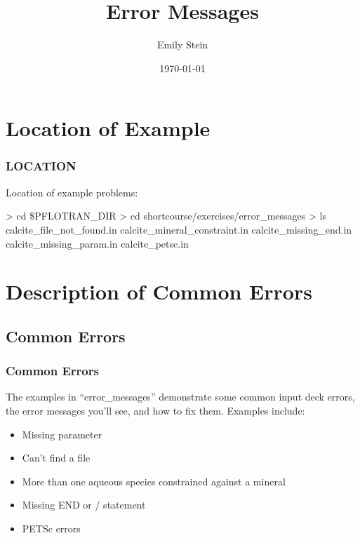 \documentclass[aspectratio=169]{beamer}
\newcommand\greencomment[1]{{{\color{green} #1}}}
\begin{document}
\title{Error Messages}
\author{Emily Stein}
\date{\today}

\frame{\titlepage}

\section{Location of Example}

\begin{frame}\frametitle{LOCATION}

Location of example problems:

\begin{semiverbatim}
> cd \$PFLOTRAN_DIR
> cd shortcourse/exercises/error_messages
> ls
calcite_file_not_found.in
calcite_mineral_constraint.in
calcite_missing_end.in
calcite_missing_param.in
calcite_petsc.in
\end{semiverbatim}

\end{frame}

\section{Description of Common Errors}

\subsection{Common Errors}

\begin{frame}\frametitle{Common Errors}
The examples in ``error\_messages'' demonstrate some common input deck errors, the error messages you'll see, and how to fix them.  Examples include:
\begin{itemize}
  \item Missing parameter
  \item Can't find a file
  \item More than one aqueous species constrained against a mineral
  \item Missing \greencomment{END} or \greencomment{/} statement
  \item PETSc errors
\end{itemize}

\end{frame}

\end{document}
